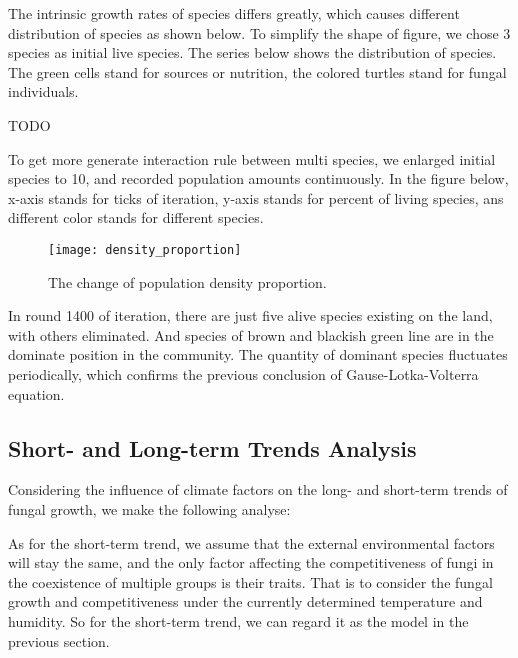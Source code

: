 \documentclass{mcmthesis}
\begin{document}
The intrinsic growth rates of species differs greatly, which causes different distribution of species as shown below. To simplify the shape of figure, we chose 3 species as initial live species. The series below shows the distribution of species. The green cells stand for sources or nutrition, the colored turtles stand for fungal individuals.

TODO

To get more generate interaction rule between multi species, we enlarged initial species to 10, and recorded population amounts continuously. In the figure below, x-axis stands for ticks of iteration, y-axis stands for percent of living species, ans different color stands for different species.

\begin{figure}[H]
  \small
  \centering
  \texttt{[image: density\_proportion]}
  \caption{The change of population density proportion.}
  \label{density_proportion}
\end{figure}

In round 1400 of iteration, there are just five alive species existing on the land, with others eliminated. And species of brown and blackish green line are in the dominate position in the community. The quantity of dominant species fluctuates periodically, which confirms the previous conclusion of  Gause-Lotka-Volterra equation.

\subsection{Short- and Long-term Trends Analysis}

Considering the influence of climate factors on the long- and short-term trends of fungal growth, we make the following analyse: 

As for the short-term trend, we assume that the external environmental factors will stay the same, and the only factor affecting the competitiveness of fungi in the coexistence of multiple groups is their traits. That is to consider the fungal growth and competitiveness under the currently determined temperature and humidity. So for the short-term trend, we can regard it as the model in the previous section.
\end{document}
